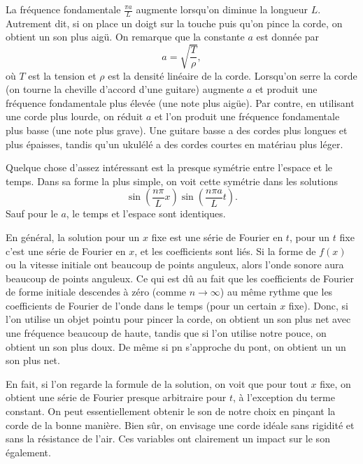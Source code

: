 La fréquence fondamentale $\frac{\pi a}{L}$ augmente lorsqu'on diminue la longueur $ L $.  Autrement dit,  si
on place un doigt sur la touche puis qu'on pince la corde,  on obtient un son plus aigü.
On remarque que la constante $ a $ est donnée par
\begin{equation*}
a = \sqrt{\frac{T}{\rho}} ,
\end{equation*}
où $T$ est la tension et  $\rho$ est la densité linéaire de la corde.
Lorsqu'on serre la corde (on tourne la cheville d'accord d'une guitare) augmente $ a $ et
produit une fréquence fondamentale plus élevée (une note plus aigüe).
Par contre, en utilisant une corde plus lourde,  on
réduit $ a $ et l'on produit une fréquence fondamentale plus basse (une note plus grave).
Une guitare basse a des cordes plus longues et plus épaisses,  tandis qu'un ukulélé a des cordes courtes
en matériau plus léger.

Quelque chose d'assez intéressant est la presque symétrie entre l'espace et le temps.
Dans sa forme la plus simple,  on voit cette symétrie dans les solutions
\begin{equation*}
\sin \left( \frac{n \pi}{L} x \right)
\sin \left( \frac{n \pi a}{L} t \right)  .
\end{equation*}
Sauf pour le $ a $, le temps et l'espace sont identiques.

En général, la solution pour un $ x $ fixe est une série de Fourier en $ t $,  pour
un $ t $ fixe c'est une série de Fourier en $ x $,  et les coefficients sont liés.
Si la forme de $ f (x) $ ou la vitesse initiale ont beaucoup de points anguleux,  alors
l'onde sonore aura beaucoup de points anguleux.  Ce qui est dû au fait que les coefficients de Fourier
de forme initiale descendes à zéro (comme $n \to \infty$) au même rythme que les coefficients de Fourier
de l'onde dans le temps (pour un certain $ x $ fixe).  Donc,  si l'on utilise un objet pointu pour
pincer la corde,  on obtient un son plus net avec une fréquence beaucoup de haute, tandis que si l'on utilise notre pouce,  on obtient un son plus doux.  De même si pn s'approche du pont,  on obtient un 
un son plus net.

En fait,  si l'on regarde la formule de la solution,  on voit que pour tout
 $ x $ fixe, on obtient une série de Fourier presque arbitraire pour $ t $,  à l'exception du 
terme constant.  On peut essentiellement obtenir le son de notre choix
en pinçant la corde de la bonne manière.
Bien sûr,  on  envisage une corde idéale sans rigidité et sans la résistance de l'air.  Ces variables ont clairement un impact sur le son également.

